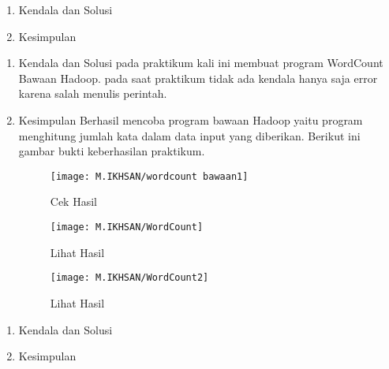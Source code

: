\begin{enumerate}
\item Kendala dan Solusi


\item Kesimpulan

\end{enumerate}

\begin{enumerate}
\item Kendala dan Solusi
\newline pada praktikum kali ini membuat program WordCount Bawaan Hadoop. pada saat praktikum tidak ada kendala hanya saja error karena salah menulis perintah.

\item Kesimpulan
Berhasil mencoba program bawaan Hadoop yaitu program menghitung jumlah kata dalam data input yang diberikan. Berikut ini gambar bukti keberhasilan praktikum.

\begin{figure}[!ht]
\texttt{[image: M.IKHSAN/wordcount bawaan1]}
\caption{Cek Hasil}
\label{gam:Hadoop-version(M.IKHSAN)}
\end{figure}

\begin{figure}[!ht]
\texttt{[image: M.IKHSAN/WordCount]}
\caption{Lihat Hasil}
\label{gam:Hadoop-version(M.IKHSAN)}
\end{figure}
\begin{figure}[!ht]
\texttt{[image: M.IKHSAN/WordCount2]}
\caption{Lihat Hasil}
\label{gam:Hadoop-version(M.IKHSAN)}
\end{figure}
\end{enumerate}

\clearpage
{}
\begin{enumerate}
\item Kendala dan Solusi


\item Kesimpulan

\end{enumerate}

